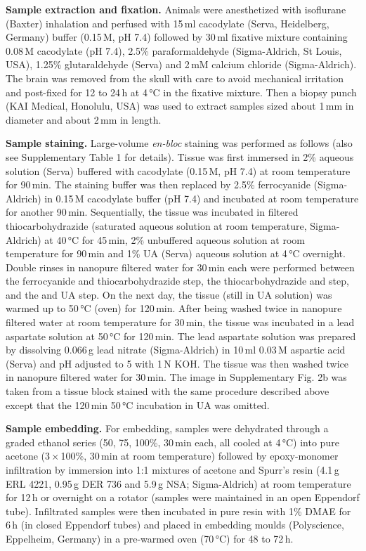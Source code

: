 \documentclass{article}
\begin{document}
\noindent\textbf{Sample extraction and fixation.} Animals were anesthetized with isoflurane (Baxter) inhalation and perfused with 15\,ml cacodylate (Serva, Heidelberg, Germany) buffer (0.15\,M, pH 7.4) followed by 30\,ml fixative mixture containing 0.08\,M cacodylate (pH 7.4), 2.5\% paraformaldehyde (Sigma-Aldrich, St Louis, USA), 1.25\% glutaraldehyde (Serva) and 2\,mM calcium chloride (Sigma-Aldrich). The brain was removed from the skull with care to avoid mechanical irritation and post-fixed for 12 to 24\,h at 4\,°C in the fixative mixture. Then a biopsy punch (KAI Medical, Honolulu, USA) was used to extract samples sized about 1\,mm in diameter and about 2\,mm in length.

\textbf{Sample staining.} Large-volume \emph{en-bloc} staining was performed as follows (also see Supplementary Table 1 for details). Tissue was first immersed in 2\%  aqueous solution (Serva) buffered with cacodylate (0.15\,M, pH 7.4) at room temperature for 90\,min. The staining buffer was then replaced by 2.5\% ferrocyanide (Sigma-Aldrich) in 0.15\,M cacodylate buffer (pH 7.4) and incubated at room temperature for another 90\,min. Sequentially, the tissue was incubated in filtered thiocarbohydrazide (saturated aqueous solution at room temperature, Sigma-Aldrich) at 40\,°C for 45\,min, 2\% unbuffered  aqueous solution at room temperature for 90\,min and 1\% UA (Serva) aqueous solution at 4\,°C overnight. Double rinses in nanopure filtered water for 30\,min each were performed between the ferrocyanide and thiocarbohydrazide step, the thiocarbohydrazide and  step, and the  and UA step. On the next day, the tissue (still in UA solution) was warmed up to 50\,°C (oven) for 120\,min. After being washed twice in nanopure filtered water at room temperature for 30\,min, the tissue was incubated in a lead aspartate solution at 50\,°C for 120\,min. The lead aspartate solution was prepared by dissolving 0.066\,g lead nitrate (Sigma-Aldrich) in 10\,ml 0.03\,M aspartic acid (Serva) and pH adjusted to 5 with 1\,N KOH. The tissue was then washed twice in nanopure filtered water for 30\,min. The image in Supplementary Fig. 2b was taken from a tissue block stained with the same procedure described above except that the 120\,min 50\,°C incubation in UA was omitted.

\textbf{Sample embedding.} For embedding, samples were dehydrated through a graded ethanol series (50, 75, 100\%, 30\,min each, all cooled at 4\,°C) into pure acetone (3\,×\,100\%, 30\,min at room temperature) followed by epoxy-monomer infiltration by immersion into 1:1 mixtures of acetone and Spurr's resin (4.1\,g ERL 4221, 0.95\,g DER 736 and 5.9\,g NSA; Sigma-Aldrich) at room temperature for 12\,h or overnight on a rotator (samples were maintained in an open Eppendorf tube). Infiltrated samples were then incubated in pure resin with 1\% DMAE for 6\,h (in closed Eppendorf tubes) and placed in embedding moulds (Polyscience, Eppelheim, Germany) in a pre-warmed oven (70\,°C) for 48 to 72\,h.
\end{document}
